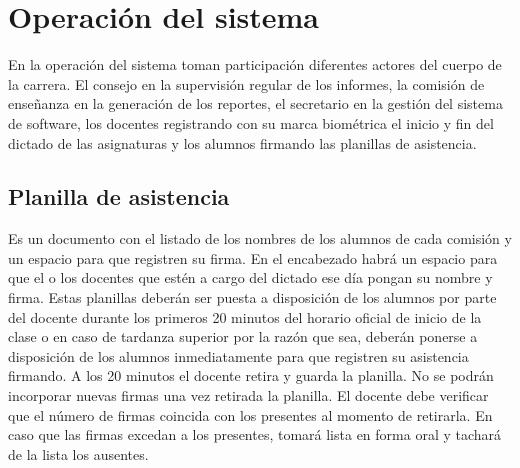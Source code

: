 \documentclass[a4paper, 11pt]{article} %
\begin{document}
\section{Operación del sistema}
En la operación del sistema toman participación diferentes actores del cuerpo de la carrera. El consejo en la supervisión regular de los informes, la comisión de enseñanza en la generación de los reportes, el secretario en la gestión del sistema de software, los docentes registrando con su marca biométrica el inicio y fin del dictado de las asignaturas y los alumnos firmando las planillas de asistencia.
\subsection{Planilla de asistencia}
Es un documento con el listado de los nombres de los alumnos de cada comisión y un espacio para que registren su firma.
En el encabezado habrá un espacio para que el o los docentes que estén a cargo del dictado ese día pongan su nombre y firma. Estas planillas deberán ser puesta a disposición de los alumnos por parte del docente durante los primeros 20 minutos del horario oficial de inicio de la clase o en caso de tardanza superior por la razón que sea, deberán ponerse a disposición de los alumnos inmediatamente para que registren su asistencia firmando. A los 20 minutos el docente retira y guarda la planilla. No se podrán incorporar nuevas firmas una vez retirada la planilla. El docente debe verificar que el número de firmas coincida con los presentes al momento de retirarla. En caso que las firmas excedan a los presentes, tomará lista en forma oral y tachará de la lista los ausentes.\\
\end{document}
